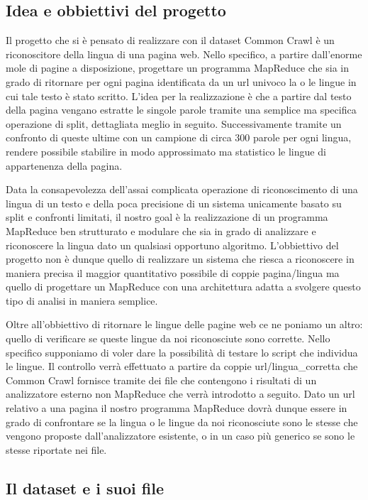 \documentclass{article}
\newcommand{\MR}{MapReduce }
\newcommand{\CC}{Common Crawl }
\begin{document}
\subsection{Idea e obbiettivi del progetto}
Il progetto che si è pensato di realizzare con il dataset \CC è un riconoscitore della lingua di una pagina web. Nello specifico, a partire dall'enorme mole di pagine a disposizione, progettare un programma \MR che sia in grado di ritornare per ogni pagina identificata da un url univoco la o le lingue in cui tale testo è stato scritto. L'idea per la realizzazione è che a partire dal testo della pagina vengano estratte le singole parole tramite una semplice ma specifica operazione di split, dettagliata meglio in seguito. Successivamente tramite un confronto di queste ultime con un campione di circa 300 parole per ogni lingua, rendere possibile stabilire in modo approssimato ma statistico le lingue di appartenenza della pagina.

Data la consapevolezza dell'assai complicata operazione di riconoscimento di una lingua di un testo e della poca precisione di un sistema unicamente basato su split e confronti limitati, il nostro goal è la realizzazione di un programma \MR ben strutturato e modulare che sia in grado di analizzare e riconoscere la lingua dato un qualsiasi opportuno algoritmo.
L'obbiettivo del progetto non è dunque quello di realizzare un sistema che riesca a riconoscere in maniera precisa il maggior quantitativo possibile di coppie pagina/lingua ma quello di progettare un \MR con una architettura adatta a svolgere questo tipo di analisi in maniera semplice.

Oltre all'obbiettivo di ritornare le lingue delle pagine web ce ne poniamo un altro: quello di verificare se queste lingue da noi riconosciute sono corrette. Nello specifico supponiamo di voler dare la possibilità di testare lo script che individua le lingue. Il controllo verrà effettuato a partire da coppie url/lingua\_corretta che \CC fornisce tramite dei file che contengono i risultati di un analizzatore esterno non \MR che verrà introdotto a seguito. Dato un url relativo a una pagina il nostro programma \MR dovrà dunque essere in grado di confrontare se la lingua o le lingue da noi riconosciute sono le stesse che vengono proposte dall'analizzatore esistente, o in un caso più generico se sono le stesse riportate nei file.


\subsection{Il dataset e i suoi file}
\end{document}
